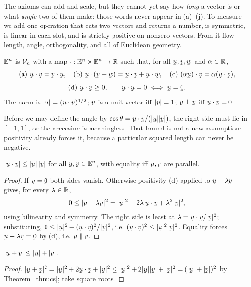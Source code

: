\medskip
The axioms can add and scale, but they cannot yet say how \emph{long} a
vector is or what \emph{angle} two of them make: those words never appear
in (a)--(j). To measure we add one operation that eats two vectors and
returns a number, is symmetric, is linear in each slot, and is strictly
positive on nonzero vectors. From it flow length, angle, orthogonality,
and all of Euclidean geometry.

\begin{definition}\label{def:ip}
$\mathbb{E}^{n}$ is $\mathcal{V}_{n}$ with a map $\cdot:\mathbb{E}^{n}\times\mathbb{E}^{n}\to\mathbb{R}$ such that, for all
$\bu,\bv,\bw$ and $\alpha\in\mathbb{R}$,
\[
\text{(a)}\ \ip\bu\bv=\ip\bv\bu,\quad
\text{(b)}\ \ip\bu{(\bv+\bw)}=\ip\bu\bv+\ip\bu\bw,\quad
\text{(c)}\ \ip{(\alpha\bu)}\bv=\alpha(\ip\bu\bv),
\]
\[
\text{(d)}\ \ip\bu\bu\ge0,\qquad \ip\bu\bu=0\iff\bu=\bze.
\]
The norm is $|\bu|=(\ip\bu\bu)^{1/2}$; $\bu$ is a unit vector iff
$|\bu|=1$; $\bu\perp\bv$ iff $\ip\bu\bv=0$.
\end{definition}

Before we may define the angle by $\cos\theta=\ip\bu\bv/(|\bu||\bv|)$, the
right side must lie in $[-1,1]$, or the arccosine is meaningless. That
bound is not a new assumption: positivity already forces it, because a
particular squared length can never be negative.

\begin{theorem}\label{thm:cs}
$|\ip\bu\bv|\le|\bu|\,|\bv|$ for all $\bu,\bv\in\En$, with equality iff
$\bu,\bv$ are parallel.
\end{theorem}

\begin{proof}
If $\bv=\bze$ both sides vanish. Otherwise positivity (d) applied to
$\bu-\lambda\bv$ gives, for every $\lambda\in\mathbb{R}$,
\[
0\le|\bu-\lambda\bv|^{2}=|\bu|^{2}-2\lambda\,\ip\bu\bv+\lambda^{2}|\bv|^{2},
\]
using bilinearity and symmetry. The right side is least at
$\lambda=\ip\bu\bv/|\bv|^{2}$; substituting,
$0\le|\bu|^{2}-(\ip\bu\bv)^{2}/|\bv|^{2}$, i.e.
$(\ip\bu\bv)^{2}\le|\bu|^{2}|\bv|^{2}$. Equality forces
$\bu-\lambda\bv=\bze$ by (d), i.e. $\bu\parallel\bv$.
\end{proof}

\begin{corollary}\label{cor:tri}
$|\bu+\bv|\le|\bu|+|\bv|$.
\end{corollary}

\begin{proof}
$|\bu+\bv|^{2}=|\bu|^{2}+2\ip\bu\bv+|\bv|^{2}
\le|\bu|^{2}+2|\bu||\bv|+|\bv|^{2}=(|\bu|+|\bv|)^{2}$ by
Theorem~\ref{thm:cs}; take square roots.
\end{proof}

